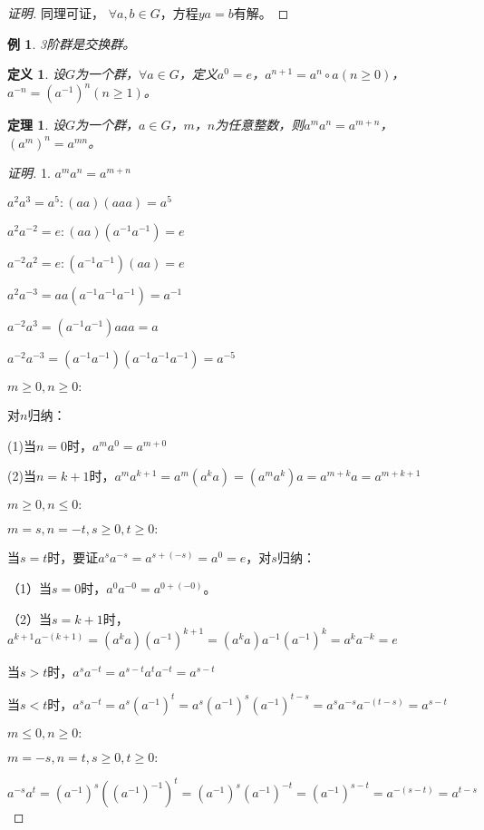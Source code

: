 \documentclass{article}
\newtheorem{Def}{定义}
\newtheorem{Thm}{定理}
\newtheorem*{Example}{例}
\begin{document}
\begin{CJK*}{UTF8}{gbsn}
\begin{proof}[证明]
  同理可证，  $\forall a,b\in G$，方程$ya=b$有解。
  \end{proof}
  
  \begin{Example}
    3阶群是交换群。
  \end{Example}
  \begin{Def}
    设$G$为一个群，$\forall a\in G$，定义$a^0=e$，$a^{n+1}=a^n\circ a$$(n\geq 0)$，$a^{-n}=(a^{-1})^n$$(n\geq 1)$。
  \end{Def}
  \begin{Thm}
  设$G$为一个群，$a\in G$，$m$，$n$为任意整数，则$a^ma^n=a^{m+n}$，$(a^m)^n=a^{mn}$。
  \end{Thm}
  \begin{proof}[证明]
    1. $a^ma^n=a^{m+n}$
  
  $a^2a^3=a^5:(aa)(aaa)=a^5$
  
  $a^2a^{-2}=e:(aa)(a^{-1}a^{-1})=e$
  
  $a^{-2}a^{2}=e:(a^{-1}a^{-1})(aa)=e$
  
  $a^2a^{-3}=aa(a^{-1}a^{-1}a^{-1})=a^{-1}$
  
  $a^{-2}a^3=(a^{-1}a^{-1})aaa=a$
  
  
  
  $a^{-2}a^{-3}=(a^{-1}a^{-1})(a^{-1}a^{-1}a^{-1})=a^{-5}$
  
  $m\geq 0,n\geq 0:$
  
  对$n$归纳：
  
  (1)当$n=0$时，$a^ma^0=a^{m+0}$
  
  (2)当$n=k+1$时，$a^{m}a^{k+1}=a^m(a^ka)=(a^ma^k)a=a^{m+k}a=a^{m+k+1}$
  
  $m\geq 0,n \leq 0:$
  
  
  $m=s,n=-t, s\geq 0,t\geq 0:$
  
  当$s=t$时，要证$a^{s}a^{-s}=a^{s+(-s)}=a^0=e$，对$s$归纳：
  
  （1）当$s=0$时，$a^0a^{-0}=a^{0+(-0)}$。
  
  （2）当$s=k+1$时，$a^{k+1}a^{-(k+1)}=(a^ka)(a^{-1})^{k+1}=(a^ka)a^{-1}(a^{-1})^k=a^ka^{-k}=e$
  
  当$s>t$时，$a^sa^{-t}=a^{s-t}a^{t}a^{-t}=a^{s-t}$
  
  当$s<t$时，$a^sa^{-t}=a^s(a^{-1})^t=a^s(a^{-1})^s(a^{-1})^{t-s}=a^sa^{-s}a^{-(t-s)}=a^{s-t}$
  
  $m\leq 0, n\geq 0:$
  
  $m=-s,n=t,s\geq 0, t\geq 0:$
  
  $a^{-s}a^t=(a^{-1})^s((a^{-1})^{-1})^t=(a^{-1})^s(a^{-1})^{-t}=(a^{-1})^{s-t}=a^{-(s-t)}=a^{t-s}$
  

\end{proof}
\end{CJK*}
\end{document}
